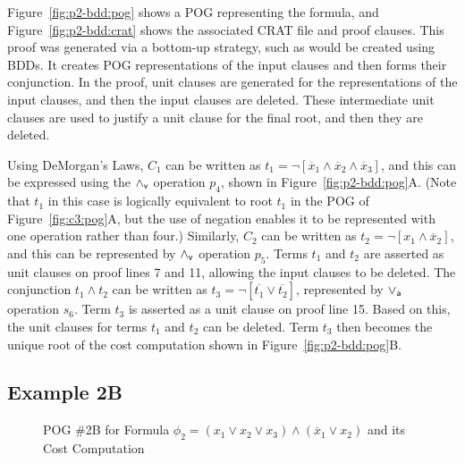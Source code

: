 \documentclass{llncs}
\newcommand{\pand}{\mathbin{\land_{\sf v}}}
\newcommand{\por}{\mathbin{\lor_{\sf a}}}
\newcommand{\obar}[1]{\overline{#1}}
\begin{document}
Figure~\ref{fig:p2-bdd:pog} shows a POG representing the formula,
and Figure~\ref{fig:p2-bdd:crat} shows the associated CRAT file and proof clauses.  This
proof was generated via a bottom-up strategy, such as would be created
using BDDs.  It creates POG representations of the input
clauses and then forms their conjunction.  In the proof, unit
clauses are generated for the representations of the input clauses,
and then the input clauses are deleted.  These intermediate unit
clauses are used to justify a unit clause for the final root, and then
they are deleted.

Using DeMorgan's Laws, $C_1$ can be written as 
$t_1 = \neg [\obar{x}_1\land \obar{x}_2\land \obar{x}_3]$, and this can be
expressed using the $\pand$ operation $p_4$, shown in
Figure~\ref{fig:p2-bdd:pog}A\@.  (Note that $t_1$ in this case is
logically equivalent to root $t_1$ in the POG of
Figure~\ref{fig:c3:pog}A, but the use of negation enables it to be
represented with one operation rather than four.)  Similarly, $C_2$
can be written as $t_2 = \neg [x_1\land \obar{x}_2]$, and this can be
represented by $\pand$ operation $p_5$.
Terms $t_1$ and $t_2$ are asserted as unit clauses on proof lines 7 and 11,
allowing the input clauses to be deleted.
The conjunction $t_1 \land t_2$
can be written as $t_3 = \neg[\obar{t_1} \lor \obar{t_2}]$, represented by $\por$ operation $s_6$.
Term $t_3$ is asserted as a unit clause on proof line 15.
Based on this, the unit clauses for terms $t_1$ and
$t_2$ can be deleted.  Term $t_3$ then becomes the unique root of the cost
computation shown in Figure~\ref{fig:p2-bdd:pog}B\@.

\subsection{Example 2B}

\begin{figure}
\caption{POG \#2B for Formula $\phi_2 = (x_1 \lor x_2 \lor x_3) \land (\obar{x}_1 \lor x_2)$ and its Cost Computation}
\label{fig:p2-cdcl:pog}
\end{figure}
\end{document}
